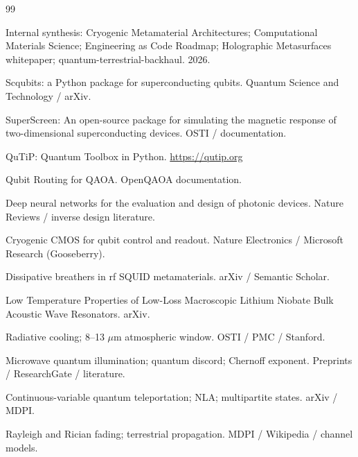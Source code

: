 \documentclass[11pt, a4paper]{article}
\begin{document}
\begin{thebibliography}{99}

 Internal synthesis: Cryogenic Metamaterial Architectures; Computational Materials Science; Engineering as Code Roadmap; Holographic Metasurfaces whitepaper; quantum-terrestrial-backhaul. 2026.

 Scqubits: a Python package for superconducting qubits. Quantum Science and Technology / arXiv.

 SuperScreen: An open-source package for simulating the magnetic response of two-dimensional superconducting devices. OSTI / documentation.

 QuTiP: Quantum Toolbox in Python. \url{https://qutip.org}

 Qubit Routing for QAOA. OpenQAOA documentation.

 Deep neural networks for the evaluation and design of photonic devices. Nature Reviews / inverse design literature.

 Cryogenic CMOS for qubit control and readout. Nature Electronics / Microsoft Research (Gooseberry).

 Dissipative breathers in rf SQUID metamaterials. arXiv / Semantic Scholar.

 Low Temperature Properties of Low-Loss Macroscopic Lithium Niobate Bulk Acoustic Wave Resonators. arXiv.

 Radiative cooling; 8--13 $\mu$m atmospheric window. OSTI / PMC / Stanford.

 Microwave quantum illumination; quantum discord; Chernoff exponent. Preprints / ResearchGate / literature.

 Continuous-variable quantum teleportation; NLA; multipartite states. arXiv / MDPI.

 Rayleigh and Rician fading; terrestrial propagation. MDPI / Wikipedia / channel models.

\end{thebibliography}
\end{document}
